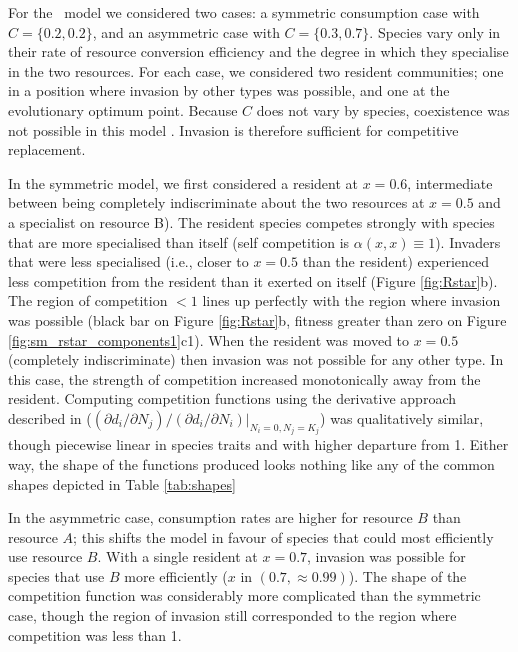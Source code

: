 \documentclass[a4paper,11pt]{article}
\begin{document}
For the \Rstar\ model we considered two cases: a symmetric
consumption case with $C = \{0.2, 0.2\}$, and an asymmetric case
with $C = \{0.3, 0.7\}$.  Species vary only in their rate of resource
conversion efficiency and the degree in which they specialise in the
two resources.  For each case, we considered two resident communities;
one in a position where invasion by other types was possible, and one at
the evolutionary optimum point.
%
Because $C$ does not vary by species, coexistence was not possible in
this model \citep{Tilman-1982}. Invasion is therefore sufficient for
competitive replacement.

In the symmetric model, we first considered a resident at $x = 0.6$,
intermediate between being completely indiscriminate about the two resources
at $x = 0.5$ and a specialist on resource B).
The resident species competes strongly with species that are more
specialised than itself (self competition is $\alpha(x, x) \equiv
1$). Invaders that were less specialised (i.e., closer to $x =
0.5$ than the resident) experienced less competition from the resident
than it exerted on itself (Figure \ref{fig:Rstar}b).
%
The region of competition $< 1$ lines up perfectly with the region
where invasion was possible (black bar on Figure \ref{fig:Rstar}b,
fitness greater than zero on Figure
\ref{fig:sm_rstar_components1}c1).
%
When the resident was moved to $x = 0.5$ (completely indiscriminate) then
invasion was not possible for any other type.  In this case, the strength of
competition increased monotonically away from the resident.
%
Computing competition functions using the derivative approach
described in \citet{Abrams-2008}
($(\partial d_i / \partial N_j) / (\partial d_i / \partial N_i) |_{N_i
  = 0, N_j = K_j}$)
was qualitatively similar, though piecewise linear in species traits
and with higher departure from 1.
Either way, the shape of the functions produced looks nothing like any of the
common shapes depicted in Table \ref{tab:shapes}

In the asymmetric case, consumption rates are higher for
resource $B$ than resource $A$; this shifts the model in favour of
species that could most efficiently use resource $B$.
%
With a single resident at $x = 0.7$, invasion was possible for species
that use $B$ more efficiently ($x$ in $(0.7, \approx 0.99)$).
%
The shape of the competition function was considerably more
complicated than the symmetric case, though the region of invasion
still corresponded to the region where competition was less than 1.
\end{document}
